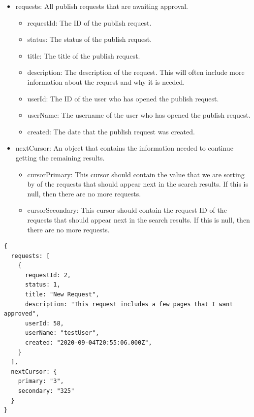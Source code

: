 \documentclass[onecolumn, draftclsnofoot,10pt, compsoc, usenames, dvipsnames]{IEEEtran}
\begin{document}
\begin{itemize}
    \item requests: All publish requests that are awaiting approval.
    \begin{itemize}
        \item requestId: The ID of the publish request.
        \item status: The status of the publish request.
        \item title: The title of the publish request.
        \item description: The description of the request. This will often include more information about the request and why it is needed.
        \item userId: The ID of the user who has opened the publish request.
        \item userName: The username of the user who has opened the publish request.
        \item created: The date that the publish request was created.
    \end{itemize}
    \item nextCursor: An object that contains the information needed to continue getting the remaining results.
    \begin{itemize}
        \item cursorPrimary: This cursor should contain the value that we are sorting by of the requests that should appear next in the search results. If this is null, then there are no more requests.
        \item cursorSecondary: This cursor should contain the request ID of the requests that should appear next in the search results. If this is null, then there are no more requests.
    \end{itemize}
\end{itemize}
\begin{lstlisting}[caption=Example Response]
{
  requests: [
    {
      requestId: 2,
      status: 1,
      title: "New Request",
      description: "This request includes a few pages that I want approved",
      userId: 58,
      userName: "testUser",
      created: "2020-09-04T20:55:06.000Z",
    }
  ],
  nextCursor: {
    primary: "3",
    secondary: "325"
  }
}
\end{lstlisting}
\\~\\
\end{document}
